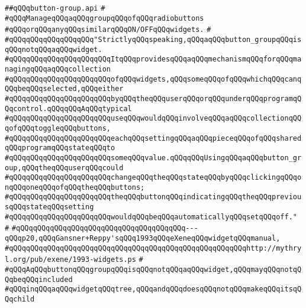 \label{src/lib/x-kit/widget/old/lib/button-group.api}
\verb|##qQQqbutton-group.api|\newline
\verb|#|\newline
\verb|#qQQqManageqQQqaqQQqgroupqQQqofqQQqradiobuttons|\newline
\verb|#qQQqorqQQqanyqQQqsimilarqQQqON/OFFqQQqwidgets.|\newline
\verb|#|\newline
\verb|#qQQqqQQqqQQqqQQqqQQq"StrictlyqQQqspeaking,qQQqaqQQqbutton_groupqQQqisqQQqnotqQQqaqQQqwidget.|\newline
\verb|#qQQqqQQqqQQqqQQqqQQqqQQqItqQQqprovidesqQQqaqQQqmechanismqQQqforqQQqmanagingqQQqaqQQqcollection|\newline
\verb|#qQQqqQQqqQQqqQQqqQQqqQQqofqQQqwidgets,qQQqsomeqQQqofqQQqwhichqQQqcanqQQqbeqQQqselected,qQQqeither|\newline
\verb|#qQQqqQQqqQQqqQQqqQQqqQQqbyqQQqtheqQQquserqQQqorqQQqunderqQQqprogramqQQqcontrol.qQQqqQQqAqQQqtypical|\newline
\verb|#qQQqqQQqqQQqqQQqqQQqqQQquseqQQqwouldqQQqinvolveqQQqaqQQqcollectionqQQqofqQQqtoggleqQQqbuttons,|\newline
\verb|#qQQqqQQqqQQqqQQqqQQqqQQqeachqQQqsettingqQQqaqQQqpieceqQQqofqQQqsharedqQQqprogramqQQqstateqQQqto|\newline
\verb|#qQQqqQQqqQQqqQQqqQQqqQQqsomeqQQqvalue.qQQqqQQqUsingqQQqaqQQqbutton_group,qQQqtheqQQquserqQQqcould|\newline
\verb|#qQQqqQQqqQQqqQQqqQQqqQQqchangeqQQqtheqQQqstateqQQqbyqQQqclickingqQQqonqQQqoneqQQqofqQQqtheqQQqbuttons;|\newline
\verb|#qQQqqQQqqQQqqQQqqQQqqQQqtheqQQqbuttonqQQqindicatingqQQqtheqQQqpreviousqQQqstateqQQqsetting|\newline
\verb|#qQQqqQQqqQQqqQQqqQQqqQQqwouldqQQqbeqQQqautomaticallyqQQqsetqQQqoff."|\newline
\verb|#|\newline
\verb|#qQQqqQQqqQQqqQQqqQQqqQQqqQQqqQQqqQQqqQQq---qQQqp20,qQQqGansner+Reppy'sqQQq1993qQQqeXeneqQQqwidgetqQQqmanual,|\newline
\verb|#qQQqqQQqqQQqqQQqqQQqqQQqqQQqqQQqqQQqqQQqqQQqqQQqqQQqqQQqhttp://mythryl.org/pub/exene/1993-widgets.ps|\newline
\verb|#|\newline
\verb|#qQQqAqQQqbuttonqQQqgroupqQQqisqQQqnotqQQqaqQQqwidget,qQQqmayqQQqnotqQQqbeqQQqincluded|\newline
\verb|#qQQqinqQQqaqQQqwidgetqQQqtree,qQQqandqQQqdoesqQQqnotqQQqmakeqQQqitsqQQqchild|\newline
